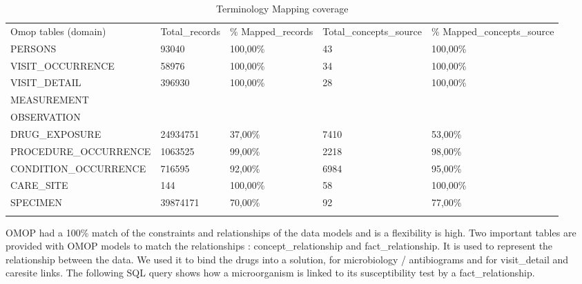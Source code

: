 \begin{table*}[t]
\caption{Terminology Mapping coverage}
\begin{tabular}{@{}lllll@{}}\toprule
Omop tables (domain)   & Total\_records & \% Mapped\_records  & Total\_concepts\_source & \% Mapped\_concepts\_source  \\\colrule
PERSONS                & 93040          & 100,00\%            & 43                      & 100,00\%                     \\
VISIT\_OCCURRENCE      & 58976          & 100,00\%            & 34                      & 100,00\%                     \\
VISIT\_DETAIL          & 396930         & 100,00\%            & 28                      & 100,00\%                     \\
MEASUREMENT            &                &                     &                         &                              \\
OBSERVATION            &                &                     &                         &                              \\
DRUG\_EXPOSURE         & 24934751       & 37,00\%             & 7410                    & 53,00\%                      \\
PROCEDURE\_OCCURRENCE  & 1063525        & 99,00\%             & 2218                    & 98,00\%                      \\
CONDITION\_OCCURRENCE  & 716595         & 92,00\%             & 6984                    & 95,00\%                      \\
CARE\_SITE             & 144            & 100,00\%            & 58                      & 100,00\%                     \\
SPECIMEN               & 39874171       & 70,00\%             & 92                      & 77,00\%                      \\\botrule
\end{tabular}
\label{table:mapping}
\end{table*}

OMOP had a 100\% match of the constraints and relationships of the data models
and is a flexibility is high. 
Two important tables are provided with OMOP models to match the relationships : 
concept\_relationship and fact\_relationship. It is used to represent the 
relationship between the data. We used it to bind the drugs into a solution, 
for microbiology / antibiograms and for visit\_detail and caresite links. 
The following SQL query shows how a microorganism is linked to its susceptibility 
test by a fact\_relationship.

